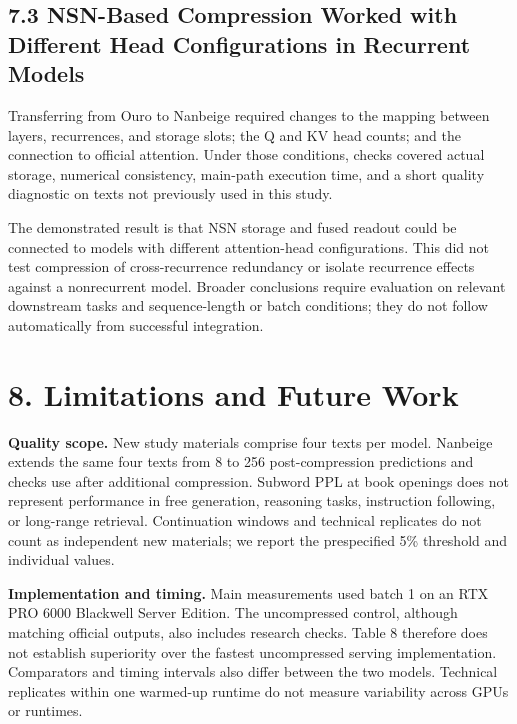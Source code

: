 \documentclass[10pt,a4paper]{article}
\begin{document}
\subsection{7.3 NSN-Based Compression Worked with Different Head Configurations in Recurrent Models}\label{nsn-based-compression-worked-with-different-head-configurations-in-recurrent-models}

Transferring from Ouro to Nanbeige required changes to the mapping between layers, recurrences, and storage slots; the Q and KV head counts; and the connection to official attention. Under those conditions, checks covered actual storage, numerical consistency, main-path execution time, and a short quality diagnostic on texts not previously used in this study.

The demonstrated result is that NSN storage and fused readout could be connected to models with different attention-head configurations. This did not test compression of cross-recurrence redundancy or isolate recurrence effects against a nonrecurrent model. Broader conclusions require evaluation on relevant downstream tasks and sequence-length or batch conditions; they do not follow automatically from successful integration.

\section{8. Limitations and Future Work}\label{limitations-and-future-work}

\textbf{Quality scope.} New study materials comprise four texts per model. Nanbeige extends the same four texts from 8 to 256 post-compression predictions and checks use after additional compression. Subword PPL at book openings does not represent performance in free generation, reasoning tasks, instruction following, or long-range retrieval. Continuation windows and technical replicates do not count as independent new materials; we report the prespecified 5\% threshold and individual values.

\textbf{Implementation and timing.} Main measurements used batch 1 on an RTX PRO 6000 Blackwell Server Edition. The uncompressed control, although matching official outputs, also includes research checks. Table 8 therefore does not establish superiority over the fastest uncompressed serving implementation. Comparators and timing intervals also differ between the two models. Technical replicates within one warmed-up runtime do not measure variability across GPUs or runtimes.
\end{document}
